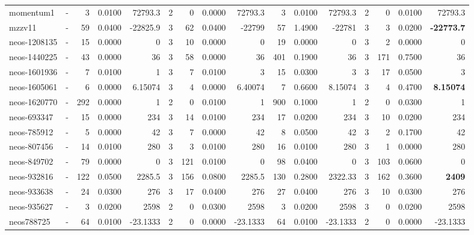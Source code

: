 \documentclass[a4paper]{article}
\begin{document}
\begin{sidewaystable}[h]
\begin{tabular}{l|r|r|r|r|r|r|r|r|r|r|r|r|r|r|r}
momentum1 & \multicolumn{1}{c|}{ - } & 3 & 0.0100 & 72793.3 & 2 & 0 & 0.0000 & 72793.3 & 3 & 0.0100 & 72793.3 & 2 & 0 & 0.0100 & 72793.3 \\
mzzv11 & \multicolumn{1}{c|}{ - } & 59 & 0.0400 & -22825.9 & 3 & 62 & 0.0400 & -22799 & 57 & 1.4900 & -22781 & 3 & 3 & 0.0200 & \textbf{-22773.7} \\
neos-1208135 & \multicolumn{1}{c|}{ - } & 15 & 0.0000 & 0 & 3 & 10 & 0.0000 & 0 & 19 & 0.0000 & 0 & 3 & 2 & 0.0000 & 0 \\
neos-1440225 & \multicolumn{1}{c|}{ - } & 43 & 0.0000 & 36 & 3 & 58 & 0.0000 & 36 & 401 & 0.1900 & 36 & 3 & 171 & 0.7500 & 36 \\
neos-1601936 & \multicolumn{1}{c|}{ - } & 7 & 0.0100 & 1 & 3 & 7 & 0.0100 & 3 & 15 & 0.0300 & 3 & 3 & 17 & 0.0500 & 3 \\
neos-1605061 & \multicolumn{1}{c|}{ - } & 6 & 0.0000 & 6.15074 & 3 & 4 & 0.0000 & 6.40074 & 7 & 0.6600 & 8.15074 & 3 & 4 & 0.4700 & \textbf{8.15074} \\
neos-1620770 & \multicolumn{1}{c|}{ - } & 292 & 0.0000 & 1 & 2 & 0 & 0.0100 & 1 & 900 & 0.1000 & 1 & 2 & 0 & 0.0300 & 1 \\
neos-693347 & \multicolumn{1}{c|}{ - } & 15 & 0.0000 & 234 & 3 & 14 & 0.0100 & 234 & 17 & 0.0200 & 234 & 3 & 10 & 0.0200 & 234 \\
neos-785912 & \multicolumn{1}{c|}{ - } & 5 & 0.0000 & 42 & 3 & 7 & 0.0000 & 42 & 8 & 0.0500 & 42 & 3 & 2 & 0.1700 & 42 \\
neos-807456 & \multicolumn{1}{c|}{ - } & 14 & 0.0100 & 280 & 3 & 3 & 0.0100 & 280 & 16 & 0.0100 & 280 & 3 & 1 & 0.0000 & 280 \\
neos-849702 & \multicolumn{1}{c|}{ - } & 79 & 0.0000 & 0 & 3 & 121 & 0.0100 & 0 & 98 & 0.0400 & 0 & 3 & 103 & 0.0600 & 0 \\
neos-932816 & \multicolumn{1}{c|}{ - } & 122 & 0.0500 & 2285.5 & 3 & 156 & 0.0800 & 2285.5 & 130 & 0.2800 & 2322.33 & 3 & 162 & 0.3600 & \textbf{2409} \\
neos-933638 & \multicolumn{1}{c|}{ - } & 24 & 0.0300 & 276 & 3 & 17 & 0.0400 & 276 & 27 & 0.0400 & 276 & 3 & 10 & 0.0300 & 276 \\
neos-935627 & \multicolumn{1}{c|}{ - } & 3 & 0.0200 & 2598 & 2 & 0 & 0.0300 & 2598 & 3 & 0.0200 & 2598 & 3 & 0 & 0.0200 & 2598 \\
neos788725 & \multicolumn{1}{c|}{ - } & 64 & 0.0100 & -23.1333 & 2 & 0 & 0.0000 & -23.1333 & 64 & 0.0100 & -23.1333 & 2 & 0 & 0.0000 & -23.1333 \\

\end{tabular}
\end{sidewaystable}
\end{document}
